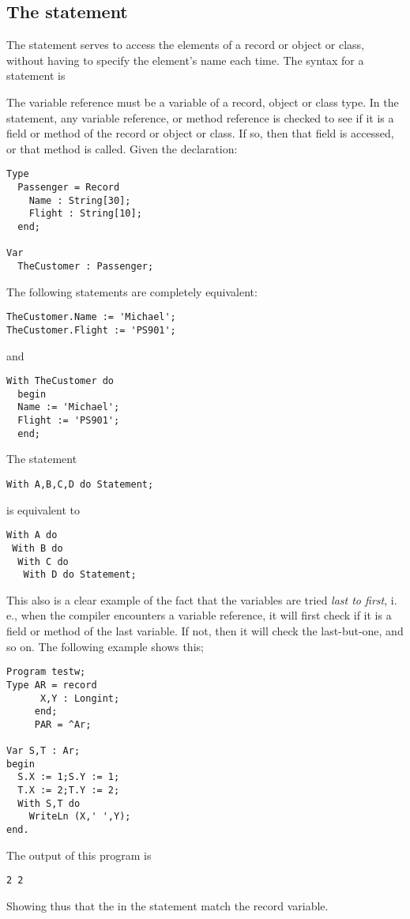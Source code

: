 \subsection{The  statement}
\label{se:With} 
The  statement serves to access the elements of a record
or object or class, without having to specify the element's name each time.
The syntax for a  statement is

The variable reference must be a variable of a record, object or class type.
In the  statement, any variable reference, or method reference is
checked to see if it is a field or method of the record or object or class.
If so, then that field is accessed, or that method is called.
Given the declaration:
\begin{verbatim}
Type
  Passenger = Record
    Name : String[30];
    Flight : String[10];
  end;

Var
  TheCustomer : Passenger;
\end{verbatim}
The following statements are completely equivalent:
\begin{verbatim}
TheCustomer.Name := 'Michael';
TheCustomer.Flight := 'PS901';
\end{verbatim}
and
\begin{verbatim}
With TheCustomer do
  begin
  Name := 'Michael';
  Flight := 'PS901';
  end;
\end{verbatim}
The statement
\begin{verbatim}
With A,B,C,D do Statement;
\end{verbatim}
is equivalent to
\begin{verbatim}
With A do
 With B do
  With C do
   With D do Statement;
\end{verbatim}
This also is a clear example of the fact that the variables are tried {\em last
to first}, i.\,e., when the compiler encounters a variable reference, it will
first check if it is a field or method of the last variable. If not, then it
will check the last-but-one, and so on.
The following example shows this;
\begin{verbatim}
Program testw;
Type AR = record
      X,Y : Longint;
     end;
     PAR = ^Ar;

Var S,T : Ar;
begin
  S.X := 1;S.Y := 1;
  T.X := 2;T.Y := 2;
  With S,T do
    WriteLn (X,' ',Y);
end.
\end{verbatim}
The output of this program is
\begin{verbatim}
2 2
\end{verbatim}
Showing thus that the  in the  statement match the
 record variable.

